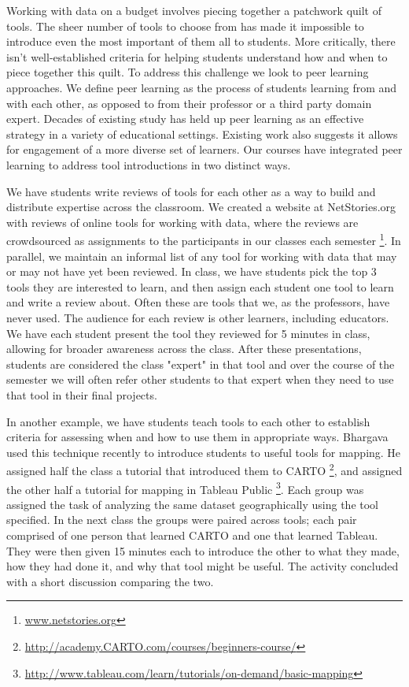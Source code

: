 \documentclass{acm_proc_article-sp}
\begin{document}
Working with data on a budget involves piecing together a patchwork quilt of tools.  The sheer number of tools to choose from has made it impossible to introduce even the most important of them all to students.  More critically, there isn't well-established criteria for helping students understand how and when to piece together this quilt.  To address this challenge we look to peer learning approaches.  We define peer learning as the process of students learning from and with each other, as opposed to from their professor or a third party domain expert.  Decades of existing study has held up peer learning as an effective strategy in a variety of educational settings\cite{sanders_peer_2001}.  Existing work also suggests it allows for engagement of a more diverse set of learners\cite{fuchs_peer-assisted_1997}.  Our courses have integrated peer learning to address tool introductions in two distinct ways.  

We have students write reviews of tools for each other as a way to build and distribute expertise across the classroom.  We created a website at NetStories.org with reviews of online tools for working with data, where the reviews are crowdsourced as assignments to the participants in our classes each semester \footnote{\url{www.netstories.org}}.  In parallel, we maintain an informal list of any tool for working with data that may or may not have yet been reviewed.  In class, we have students pick the top 3 tools they are interested to learn, and then assign each student one tool to learn and write a review about. Often these are tools that we, as the professors, have never used. The audience for each review is other learners, including educators.  We have each student present the tool they reviewed for 5 minutes in class, allowing for broader awareness across the class. After these presentations, students are considered the class "expert" in that tool and over the course of the semester we will often refer other students to that expert when they need to use that tool in their final projects. 

In another example, we have students teach tools to each other to establish criteria for assessing when and how to use them in appropriate ways.  Bhargava used this technique recently to introduce students to useful tools for mapping.  He assigned half the class a tutorial that introduced them to CARTO \footnote{\url{http://academy.CARTO.com/courses/beginners-course/}}, and assigned the other half a tutorial for mapping in Tableau Public  \footnote{\url{http://www.tableau.com/learn/tutorials/on-demand/basic-mapping}}.  Each group was assigned the task of analyzing the same dataset geographically using the tool specified.  In the next class the groups were paired across tools; each pair comprised of one person that learned CARTO and one that learned Tableau.  They were then given 15 minutes each to introduce the other to what they made, how they had done it, and why that tool might be useful.  The activity concluded with a short discussion comparing the two.
\end{document}
